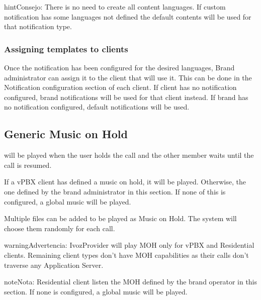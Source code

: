 \documentclass[letterpaper,10pt,spanish]{sphinxmanual}
\begin{document}
\begin{notice}{hint}{Consejo:}
There is no need to create all content languages. If custom notification has some languages not defined the
default contents will be used for that notification type.
\end{notice}


\subsubsection{Assigning templates to clients}
\label{administration_portal/brand/settings/notification_templates:assigning-templates-to-clients}
Once the notification has been configured for the desired languages, Brand administrator can assign it to the
client that will use it. This can be done in the Notification configuration section of each client.
If client has no notification configured, brand notifications will be used for that client instead. If brand has no
notification configured, default notifications will be used.


\subsection{Generic Music on Hold}
\label{administration_portal/brand/settings/generic_music_on_hold:generic-music-on-hold}\label{administration_portal/brand/settings/generic_music_on_hold::doc}
{\hyperref[administration_portal/client/vpbx/multimedia/music_on_hold:music\string-on\string-hold]{}} will be played when the user holds the call and the other
member waits until the call is resumed.

If a vPBX client has defined a music on hold, it will be played. Otherwise, the
one defined by the brand administrator in this section. If none of this is configured,
a global music will be played.

Multiple files can be added to be played as Music on Hold. The system will choose them randomly for each call.

\begin{notice}{warning}{Advertencia:}
IvozProvider will play MOH only for vPBX and Residential clients. Remaining client
types don't have MOH capabilities as their calls don't traverse any Application Server.
\end{notice}

\begin{notice}{note}{Nota:}
Residential client listen the MOH defined by the brand operator in this section. If none is configured,
a global music will be played.
\end{notice}
\end{document}
